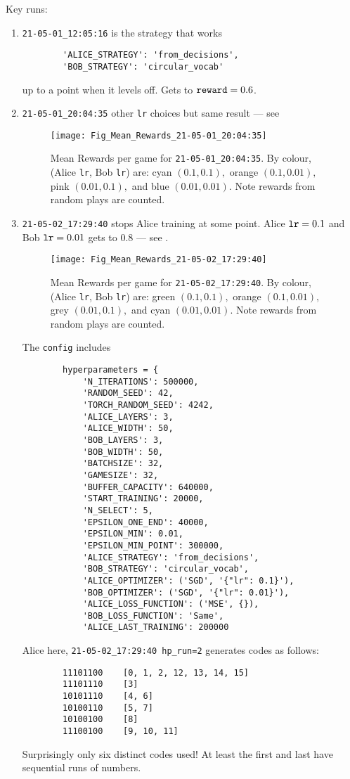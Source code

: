 \documentclass[12pt]{article}
\begin{document}
Key runs:  
\begin{enumerate}
	\item \verb|21-05-01_12:05:16| is the strategy that works 
	\begin{lstlisting}
		'ALICE_STRATEGY': 'from_decisions',
		'BOB_STRATEGY': 'circular_vocab'
	\end{lstlisting}
	up to a point when it levels off.  Gets to $\verb|reward|=0.6$.
	
	\item  \verb|21-05-01_20:04:35| other \verb|lr| choices but same result --- see 
	\begin{figure}
		\centering
		\texttt{[image: Fig\_Mean\_Rewards\_21-05-01\_20:04:35]}
		\caption{Mean Rewards per game for \texttt{21-05-01\_20:04:35}.  By colour, (Alice \texttt{lr}, Bob \texttt{lr}) are: cyan $(0.1, 0.1),$ orange $(0.1, 0.01),$ pink $(0.01, 0.1),$ and blue $(0.01, 0.01).$ Note rewards from random plays are counted.}
		\label{fig:figmeanrewards21-05-01200435}
	\end{figure}

	\item \verb|21-05-02_17:29:40| stops Alice training at some point. Alice $\verb|lr|=0.1$ and Bob $\verb|lr|=0.01$ gets to $0.8$ --- see .
	\begin{figure}
		\centering
		\texttt{[image: Fig\_Mean\_Rewards\_21-05-02\_17:29:40]}
		\caption{Mean Rewards per game for \texttt{21-05-02\_17:29:40}.  By colour, (Alice \texttt{lr}, Bob \texttt{lr}) are: green $(0.1, 0.1),$ orange $(0.1, 0.01),$ grey $(0.01, 0.1),$ and cyan $(0.01, 0.01).$   Note rewards from random plays are counted.}
		\label{fig:figmeanrewards21-05-02172940}
	\end{figure}
	The \verb|config| includes
	\begin{lstlisting}
		hyperparameters = {
			'N_ITERATIONS': 500000,
			'RANDOM_SEED': 42,
			'TORCH_RANDOM_SEED': 4242,
			'ALICE_LAYERS': 3,
			'ALICE_WIDTH': 50,
			'BOB_LAYERS': 3,
			'BOB_WIDTH': 50,
			'BATCHSIZE': 32,
			'GAMESIZE': 32,
			'BUFFER_CAPACITY': 640000,
			'START_TRAINING': 20000,
			'N_SELECT': 5,
			'EPSILON_ONE_END': 40000,
			'EPSILON_MIN': 0.01,
			'EPSILON_MIN_POINT': 300000,
			'ALICE_STRATEGY': 'from_decisions',
			'BOB_STRATEGY': 'circular_vocab',
			'ALICE_OPTIMIZER': ('SGD', '{"lr": 0.1}'),
			'BOB_OPTIMIZER': ('SGD', '{"lr": 0.01}'),
			'ALICE_LOSS_FUNCTION': ('MSE', {}),
			'BOB_LOSS_FUNCTION': 'Same',
			'ALICE_LAST_TRAINING': 200000
	\end{lstlisting}
	Alice here, \verb|21-05-02_17:29:40 hp_run=2| generates codes as follows:
	\begin{lstlisting}
		11101100	[0, 1, 2, 12, 13, 14, 15]
		11101110	[3]
		10101110	[4, 6]
		10100110	[5, 7]
		10100100	[8]
		11100100	[9, 10, 11]
	\end{lstlisting}
	Surprisingly only six distinct codes used!  At least the first and last have sequential runs of numbers.


\end{enumerate}
\end{document}
